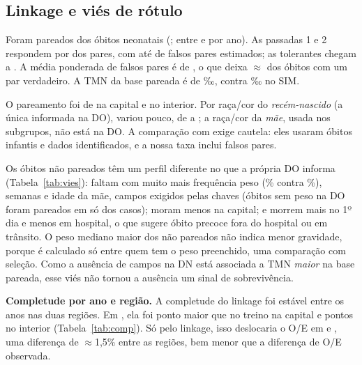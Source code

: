 \documentclass[12pt]{article}
\begin{document}
\subsection{Linkage e viés de rótulo}
\label{sec:vies}

Foram pareados \nPareados{} dos \nObitosSIM{} óbitos neonatais (\pctPareado{}; entre \pctPareadoMin{} e \pctPareadoMax{} por ano). As passadas 1 e 2 respondem por \pctParesUmDois{} dos pares, com até \falsosUmDoisMax{} de falsos pares estimados; as tolerantes chegam a \falsosMax{}. A média ponderada de falsos pares é de \falsosPonderado{}, o que deixa $\approx$\pctVerdadeiros{} dos óbitos com um par verdadeiro. A TMN da base pareada é de \tmnPareada{}‰, contra \tmnSIM{}‰ no SIM.

O pareamento foi de \linkCap{} na capital e \linkInt{} no interior. Por raça/cor do \emph{recém-nascido} (a única informada na DO), variou pouco, de \linkRacaMin{} a \linkRacaMax{}; a raça/cor da \emph{mãe}, usada nos subgrupos, não está na DO. A comparação com \cite{maia2017} exige cautela: eles usaram óbitos infantis e dados identificados, e a nossa taxa inclui falsos pares.

Os \nNaoPareados{} óbitos não pareados têm um perfil diferente no que a própria DO informa (Tabela~\ref{tab:vies}): faltam com muito mais frequência peso (\nparPesoAus{}\% contra \parPesoAus{}\%), semanas e idade da mãe, campos exigidos pelas chaves (óbitos sem peso na DO foram pareados em só \linkPesoAus{} dos casos); moram menos na capital; e morrem mais no 1º dia e menos em hospital, o que sugere óbito precoce fora do hospital ou em trânsito.
O peso mediano maior dos não pareados não indica menor gravidade, porque é calculado só entre quem tem o peso preenchido, uma comparação com seleção. Como a ausência de campos na DN está associada a TMN \emph{maior} na base pareada, esse viés não tornou a ausência um sinal de sobrevivência.

\textbf{Completude por ano e região.} A completude do linkage foi estável entre os anos nas duas regiões. Em \anoTeste{}, ela foi \compDifCap{} ponto maior que no treino na capital e \compDifInt{} pontos no interior (Tabela~\ref{tab:comp}). Só pelo linkage, isso deslocaria o O/E em \oeLinkCap{} e \oeLinkInt{}, uma diferença de $\approx$1,5\% entre as regiões, bem menor que a diferença de O/E observada.

\begin{table}[!htbp]
\centering
\caption{Completude do linkage e O/E por região (XGBoost recalibrado, teste de \anoTeste).}
\label{tab:comp}
\small
\setlength{\tabcolsep}{4pt}
\tabCompletude
\end{table}
\end{document}
